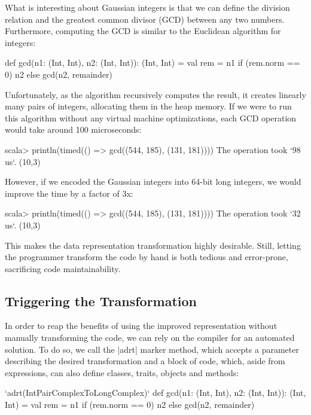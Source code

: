What is interesting about Gaussian integers is that we can define the division relation and the greatest common divisor (GCD) between any two numbers. Furthermore, computing the GCD is similar to the Euclidean algorithm for integers:

\begin{lstlisting-nobreak}
def gcd(n1: (Int, Int), n2: (Int, Int)): (Int, Int) = {
  val rem = n1 %
  if (rem.norm == 0) n2 else gcd(n2, remainder)
}
\end{lstlisting-nobreak}

Unfortunately, as the algorithm recursively computes the result, it creates linearly many pairs of integers, allocating them in the heap memory. If we were to run this algorithm without any virtual machine optimizations, each GCD operation would take around 100 microseconds:

\begin{lstlisting-nobreak}
scala>   println(timed(() => gcd((544, 185), (131, 181))))
The operation took `98 us`.
(10,3)
\end{lstlisting-nobreak}

However, if we encoded the Gaussian integers into 64-bit long integers, we would improve the time by a factor of 3x:

\begin{lstlisting-nobreak}
scala> println(timed(() => gcd((544, 185), (131, 181))))
The operation took `32 us`.
(10,3)
\end{lstlisting-nobreak}

This makes the data representation transformation highly desirable. Still, letting the programmer transform the code by hand is both tedious and error-prone, sacrificing code maintainability.

\subsection{Triggering the Transformation}

In order to reap the benefits of using the improved representation without manually transforming the code, we can rely on the compiler for an automated solution. To do so, we call the |adrt| marker method, which accepts a parameter describing the desired transformation and a block of code, which, aside from expressions, can also define classes, traits, objects and methods:

\begin{lstlisting-nobreak}
`adrt(IntPairComplexToLongComplex)` {
  def gcd(n1: (Int, Int), n2: (Int, Int)): (Int, Int) = {
    val rem = n1 %
    if (rem.norm == 0) n2 else gcd(n2, remainder)
  }
}
\end{lstlisting-nobreak}

